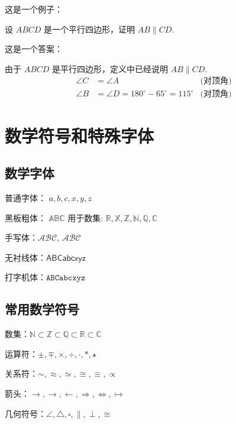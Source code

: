 \documentclass[a4paper,fontsize=8pt]{kaobook}
\begin{document}
这是一个例子：
\begin{example}
    设 $ABCD$ 是一个平行四边形，证明 $AB \parallel CD$.
\end{example}


这是一个答案：
\begin{theorem}
    由于 $ABCD$ 是平行四边形，定义中已经说明 $AB \parallel CD$.
    \begin{align*}
        \angle C &= \angle A & \text{(对顶角)} \\
        \angle B &= \angle D=180^\circ -65^\circ=115^\circ & \text{(对顶角)}
    \end{align*}
\end{theorem}


\chapter{数学符号和特殊字体}

\section{数学字体}
普通字体： $a, b, c, x, y, z$

黑板粗体： $\mathbb{ABC}$ 用于数集: $\mathbb{R}, \mathbb{X}, \mathbb{Z}, \mathbb{N}, \mathbb{Q}, \mathbb{C}$

手写体：$\mathcal{ABC}$, $\mathscr{ABC}$

无衬线体：$\mathsf{ABCabcxyz}$

打字机体：$\mathtt{ABCabcxyz}$


\section{常用数学符号}
数集：$\mathbb{N} \subset \mathbb{Z} \subset \mathbb{Q} \subset \mathbb{R} \subset \mathbb{C}$

运算符：$\pm, \mp, \times, \div, \cdot, \ast, \star$

关系符：$\sim, \approx, \simeq, \cong, \equiv, \propto$

箭头：$\to, \rightarrow, \leftarrow, \Rightarrow, \Leftrightarrow, \mapsto$

几何符号：$\angle, \triangle, \square, \parallel, \perp, \cong$
\end{document}
